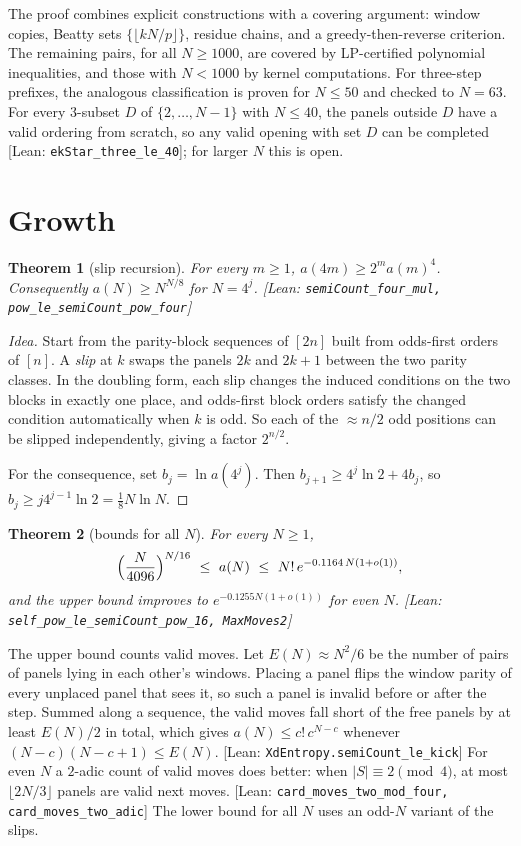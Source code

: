 \documentclass[11pt]{article}
\newtheorem{theorem}{Theorem}
\theoremstyle{definition}
\theoremstyle{remark}
\newcommand{\lean}[1]{\textsf{\small[Lean: \texttt{#1}]}}
\begin{document}
The proof combines explicit constructions with a covering argument: window copies,
Beatty sets $\{\lfloor kN/p\rfloor\}$, residue chains, and a greedy-then-reverse
criterion. The remaining pairs, for all $N\ge1000$, are covered by LP-certified
polynomial inequalities, and those with $N<1000$ by kernel computations. For
three-step prefixes, the analogous classification is proven for $N\le 50$ and checked to
$N=63$. For every $3$-subset $D$ of $\{2,\dots,N-1\}$ with $N\le 40$, the panels outside $D$ have a valid ordering from scratch, so any valid opening with set $D$ can be completed \lean{ekStar\_three\_le\_40}; for larger $N$ this is open.

\section{Growth}

\begin{theorem}[slip recursion]
For every $m\ge1$, $a(4m)\ge 2^m a(m)^4$. Consequently $a(N)\ge N^{N/8}$ for $N=4^j$.
\lean{semiCount\_four\_mul, pow\_le\_semiCount\_pow\_four}
\end{theorem}

\begin{proof}[Idea]
Start from the parity-block sequences of $[2n]$ built from odds-first orders of
$[n]$. A \emph{slip} at $k$ swaps the panels $2k$ and $2k+1$ between the two parity
classes. In the doubling form, each slip changes the induced conditions on the two
blocks in exactly one place, and odds-first block orders satisfy the changed condition
automatically when $k$ is odd. So each of the $\approx n/2$ odd positions can be slipped
independently, giving a factor $2^{n/2}$.

For the consequence, set $b_j=\ln a(4^j)$. Then $b_{j+1}\ge 4^j\ln2+4b_j$, so
$b_j\ge j4^{j-1}\ln 2=\tfrac18 N\ln N$.
\end{proof}

\begin{theorem}[bounds for all $N$]
For every $N\ge1$,
\[
  \Bigl(\frac{N}{4096}\Bigr)^{N/16}\ \le\ a(N)\ \le\ N!\,e^{-0.1164\,N(1+o(1))},
\]
and the upper bound improves to $e^{-0.1255N(1+o(1))}$ for even $N$.
\lean{self\_pow\_le\_semiCount\_pow\_16, MaxMoves2}
\end{theorem}

The upper bound counts valid moves. Let $E(N)\approx N^2/6$ be the number of pairs of
panels lying in each other's windows. Placing a panel flips the window parity of every
unplaced panel that sees it, so such a panel is invalid before or after the step. Summed
along a sequence, the valid moves fall short of the free panels by at least $E(N)/2$ in
total, which gives $a(N)\le c!\,c^{N-c}$ whenever $(N-c)(N-c+1)\le E(N)$.
\lean{XdEntropy.semiCount\_le\_kick} For even $N$ a $2$-adic count of valid moves does
better: when $|S|\equiv2\pmod4$, at most $\lfloor2N/3\rfloor$ panels are valid next moves.
\lean{card\_moves\_two\_mod\_four, card\_moves\_two\_adic}
The lower bound for all $N$
uses an odd-$N$ variant of the slips.
\end{document}
